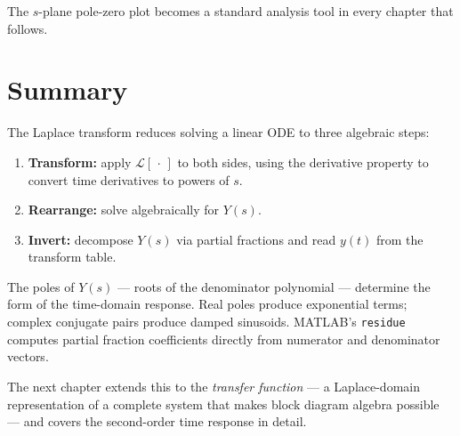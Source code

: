 \documentclass[12pt]{article}
\begin{document}
The $s$-plane pole-zero plot becomes a standard analysis tool in every chapter
that follows.

\section{Summary}
\label{sec:summary}

The Laplace transform reduces solving a linear ODE to three algebraic steps:
\begin{enumerate}
  \item \textbf{Transform:} apply $\mathcal{L}[\,\cdot\,]$ to both sides, using
    the derivative property to convert time derivatives to powers of $s$.
  \item \textbf{Rearrange:} solve algebraically for $Y(s)$.
  \item \textbf{Invert:} decompose $Y(s)$ via partial fractions and read $y(t)$
    from the transform table.
\end{enumerate}

The poles of $Y(s)$ --- roots of the denominator polynomial --- determine the
form of the time-domain response.  Real poles produce exponential terms;
complex conjugate pairs produce damped sinusoids.  MATLAB's \texttt{residue}
computes partial fraction coefficients directly from numerator and denominator
vectors.

The next chapter extends this to the \emph{transfer function} --- a
Laplace-domain representation of a complete system that makes block diagram
algebra possible --- and covers the second-order time response in detail.
\end{document}
